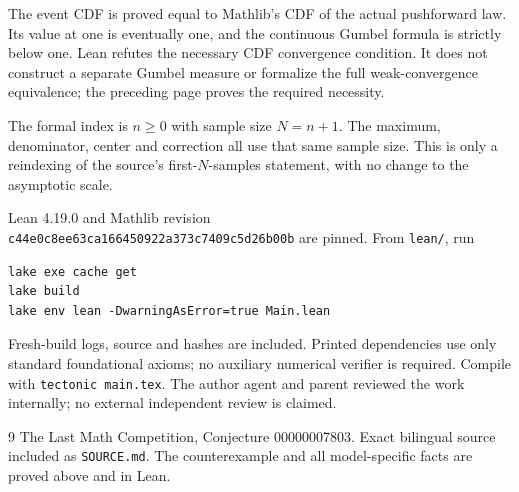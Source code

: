 \documentclass[11pt]{article}
\begin{document}
The event CDF is proved equal to Mathlib's CDF of the
actual pushforward law. Its value at one is eventually
one, and the continuous Gumbel formula is strictly
below one. Lean refutes the necessary CDF convergence
condition. It does not construct a separate Gumbel
measure or formalize the full weak-convergence equivalence;
the preceding page proves the required necessity.

The formal index is $n\geq0$ with sample size $N=n+1$.
The maximum, denominator, center and correction all use
that same sample size. This is only a reindexing of the
source's first-$N$-samples statement, with no change
to the asymptotic scale.

Lean 4.19.0 and Mathlib revision\\
\texttt{c44e0c8ee63ca166450922a373c7409c5d26b00b}
are pinned. From \texttt{lean/}, run
\begin{verbatim}
lake exe cache get
lake build
lake env lean -DwarningAsError=true Main.lean
\end{verbatim}
Fresh-build logs, source and hashes are included.
Printed dependencies use only standard foundational
axioms; no auxiliary numerical verifier is required.
Compile with \texttt{tectonic main.tex}.
The author agent and parent reviewed the work internally;
no external independent review is claimed.

\begin{thebibliography}{9}
 The Last Math Competition,
Conjecture 00000007803. Exact bilingual source included
as \texttt{SOURCE.md}. The counterexample and all
model-specific facts are proved above and in Lean.
\end{thebibliography}
\end{document}
